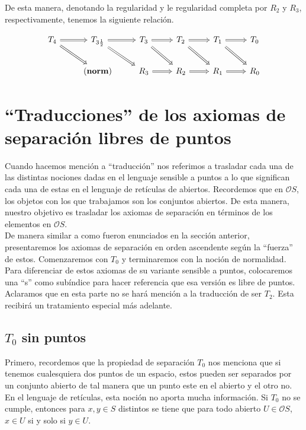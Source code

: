 \documentclass{comunicaciones}
\begin{document}
De esta manera, denotando la regularidad y le regularidad completa por $R_2$ y $R_3$, respectivamente, tenemos la siguiente relación.

    \[\begin{tikzcd}
	{T_4} & {T_{3\frac{1}{2}}} & {T_3} & {T_2} & {T_1} & {T_0} \\
	& {(\mathbf{norm})} & {R_3} & {R_2} & {R_1} & {R_0}
	\arrow[Rightarrow, from=1-2, to=1-3]
	\arrow[Rightarrow, from=1-3, to=1-4]
	\arrow[Rightarrow, from=1-4, to=1-5]
	\arrow[Rightarrow, from=1-5, to=1-6]
	\arrow[Rightarrow, from=1-1, to=1-2]
	\arrow[Rightarrow, from=1-1, to=2-2]
	\arrow[Rightarrow, from=1-2, to=2-3]
	\arrow[Rightarrow, from=1-3, to=2-4]
	\arrow[Rightarrow, from=1-4, to=2-5]
	\arrow[Rightarrow, from=1-5, to=2-6]
	\arrow[Rightarrow, from=2-3, to=2-4]
	\arrow[Rightarrow, from=2-4, to=2-5]
	\arrow[Rightarrow, from=2-5, to=2-6]
\end{tikzcd}\]

\section{``Traducciones'' de los axiomas de separación libres de puntos}
Cuando hacemos mención a ``traducción'' nos referimos a trasladar cada una de las distintas nociones dadas en el lenguaje sensible a puntos a lo que significan cada una de estas en el lenguaje de retículas de abiertos. Recordemos que en $\mathcal{O}S$, los objetos con los que trabajamos son los conjuntos abiertos. De esta manera, nuestro objetivo es trasladar los axiomas de separación en términos de los elementos en $\mathcal{O}S$.\\

De manera similar a como fueron enunciados en la sección anterior, presentaremos los axiomas de separación en orden ascendente según la ``fuerza'' de estos. Comenzaremos con $T_0$ y terminaremos con la noción de normalidad. Para diferenciar de estos axiomas de su variante sensible a puntos, colocaremos una ``s'' como subíndice para hacer referencia que esa versión es libre de puntos. Aclaramos que en esta parte no se hará mención a la traducción de ser $T_2$. Esta recibirá un tratamiento especial más adelante.

\subsection{$T_0$ sin puntos}

Primero, recordemos que la propiedad de separación $T_0$ nos menciona que si tenemos cualesquiera dos puntos de un espacio, estos pueden ser separados por un conjunto abierto de tal manera que un punto este en el abierto y el otro no. En el lenguaje de retículas, esta noción no aporta mucha información. Si $T_0$ no se cumple, entonces para $x, y\in S$ distintos se tiene que para todo abierto $U\in \mathcal{O}S$, $x\in U$ si y solo si $y\in U$.\\
\end{document}
